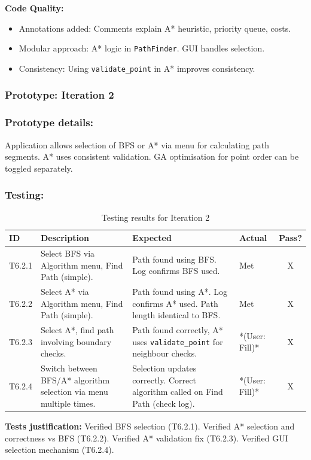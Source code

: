 \textbf{Code Quality:}
\begin{itemize}
	\item Annotations added: Comments explain A* heuristic, priority queue, costs.
	\item Modular approach: A* logic in \verb|PathFinder|. GUI handles selection.
	\item Consistency: Using \verb|validate_point| in A* improves consistency.
\end{itemize}

\newpage
\subsubsection*{Prototype: Iteration 2}


\newpage
\subsubsection{Prototype details:}
Application allows selection of BFS or A* via menu for calculating path segments. A* uses consistent validation. GA optimisation for point order can be toggled separately.

\subsubsection{Testing:} %
\begin{table}[htbp]
	\centering
	\begin{tabularx}{\textwidth}{|l|X|p{4.5cm}|p{1.5cm}|c|}
		\hline
		\textbf{ID} & \textbf{Description} & \textbf{Expected} & \textbf{Actual} & \textbf{Pass?} \\
		\hline
		T6.2.1 & Select BFS via Algorithm menu, Find Path (simple). & Path found using BFS. Log confirms BFS used. & Met & X \\
		\hline
		T6.2.2 & Select A* via Algorithm menu, Find Path (simple). & Path found using A*. Log confirms A* used. Path length identical to BFS. & Met & X \\
		\hline
		T6.2.3 & Select A*, find path involving boundary checks. & Path found correctly, A* uses \verb|validate_point| for neighbour checks. & *(User: Fill)* & X \\
		\hline
		T6.2.4 & Switch between BFS/A* algorithm selection via menu multiple times. & Selection updates correctly. Correct algorithm called on Find Path (check log). & *(User: Fill)* & X \\
		\hline
	\end{tabularx}
	\caption{Testing results for Iteration 2}
\end{table}
\textbf{Tests justification:} Verified BFS selection (T6.2.1). Verified A* selection and correctness vs BFS (T6.2.2). Verified A* validation fix (T6.2.3). Verified GUI selection mechanism (T6.2.4).


